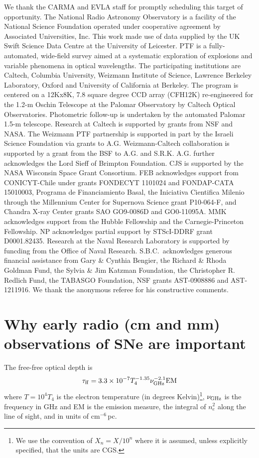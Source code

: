 \documentclass{emulateapj}
\begin{document}
We thank the CARMA and EVLA staff for promptly scheduling this target
of opportunity. The National Radio Astronomy Observatory is a facility
of the National Science Foundation operated under cooperative
agreement by Associated Universities, Inc. This work made use of data supplied by the UK Swift
Science Data Centre at the University of Leicester. PTF is a fully-automated, wide-field survey aimed at a systematic exploration of explosions and variable phenomena in optical wavelengths. The participating institutions are
Caltech, Columbia University, Weizmann Institute of Science, Lawrence
Berkeley Laboratory, Oxford and University of California at
Berkeley. The program is centered on a 12Kx8K, 7.8 square degree CCD
array (CFH12K) re-engineered for the 1.2-m Oschin Telescope at the
Palomar Observatory by Caltech Optical Observatories. Photometric
follow-up is undertaken by the automated Palomar 1.5-m
telescope. Research at Caltech is supported by grants from NSF and
NASA. The Weizmann PTF partnership is supported in part by the Israeli
Science Foundation via grants to A.G. Weizmann-Caltech collaboration
is supported by a grant from the BSF to A.G. and S.R.K. A.G. further
acknowledges the Lord Sieff of Brimpton Foundation. CJS is supported
by the NASA Wisconsin Space Grant Consortium.
FEB acknowledges support from CONICYT-Chile under grants FONDECYT
1101024 and FONDAP-CATA 15010003, Programa de Financiamiento Basal,
the Iniciativa Cientifica Milenio through the Millennium Center for
Supernova Science grant P10-064-F, and Chandra X-ray Center grants SAO
GO9-0086D and GO0-11095A. MMK acknowledges support from the Hubble Fellowship and the
Carnegie-Princeton Fellowship. NP acknowledges partial support by
STScI-DDRF grant D0001.82435. Research at the Naval Research
Laboratory is supported by funcding from the Office of Naval
Research. S.B.C.~acknowledges generous financial assistance from Gary
\& Cynthia Bengier, the Richard \& Rhoda Goldman Fund, the Sylvia \&
Jim Katzman Foundation, the Christopher R. Redlich Fund, the TABASGO
Foundation, NSF grants AST-0908886 and AST-1211916. We thank the anonymous referee for his constructive
comments. 

\appendix
\section{Why early radio (cm and mm) observations of SNe are important}

The free-free optical depth is
\begin{equation}
	\tau_{\rm ff}=3.3\times 10^{-7}T_4^{-1.35}\nu_{\rm GHz}^{-2.1} {\rm EM}
\end{equation}
where $T=10^4T_4$ is the electron temperature (in degrees
Kelvin)\footnote{We use the convention of $X_n=X/10^n$ where it is
assumed, unless explicitly specified, that the units are CGS.},
$\nu_{\rm GHz}$ is the frequency in GHz and EM is the emission
measure, the integral of $n_e^2$ along the line of sight, and in
units of cm$^{-6}$\,pc. 
\end{document}

